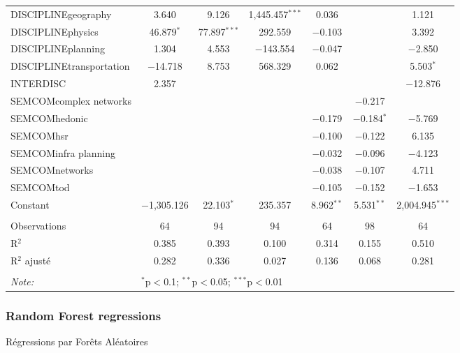 \begin{table}[!htbp]
\begin{tabular}{lcccccc}
  DISCIPLINEgeography & 3.640 & 9.126 & 1,445.457$^{***}$ & 0.036 &  & 1.121 \\ 
  DISCIPLINEphysics & 46.879$^{*}$ & 77.897$^{***}$ & 292.559 & $-$0.103 &  & 3.392 \\ 
  DISCIPLINEplanning & 1.304 & 4.553 & $-$143.554 & $-$0.047 &  & $-$2.850 \\ 
  DISCIPLINEtransportation & $-$14.718 & 8.753 & 568.329 & 0.062 &  & 5.503$^{*}$ \\ 
  INTERDISC & 2.357 &  &  &  &  & $-$12.876 \\ 
  SEMCOMcomplex networks &  &  &  &  & $-$0.217 &  \\ 
  SEMCOMhedonic &  &  &  & $-$0.179 & $-$0.184$^{*}$ & $-$5.769 \\ 
  SEMCOMhsr &  &  &  & $-$0.100 & $-$0.122 & 6.135 \\ 
  SEMCOMinfra planning &  &  &  & $-$0.032 & $-$0.096 & $-$4.123 \\ 
  SEMCOMnetworks &  &  &  & $-$0.038 & $-$0.107 & 4.711 \\ 
  SEMCOMtod &  &  &  & $-$0.105 & $-$0.152 & $-$1.653 \\ 
  Constant & $-$1,305.126 & 22.103$^{*}$ & 235.357 & 8.962$^{**}$ & 5.531$^{**}$ & 2,004.945$^{***}$ \\ 
 \hline \\[-1.8ex] 
Observations & 64 & 94 & 94 & 64 & 98 & 64 \\ 
R$^{2}$ & 0.385 & 0.393 & 0.100 & 0.314 & 0.155 & 0.510 \\ 
R$^{2}$ ajusté & 0.282 & 0.336 & 0.027 & 0.136 & 0.068 & 0.281 \\ 
\hline 
\hline \\[-1.8ex] 
\textit{Note:}  & \multicolumn{6}{l}{$^{*}$p$<$0.1; $^{**}$p$<$0.05; $^{***}$p$<$0.01} \\ 
\end{tabular}
\end{table} 




\subsubsection{Random Forest regressions}{Régressions par Forêts Aléatoires}


